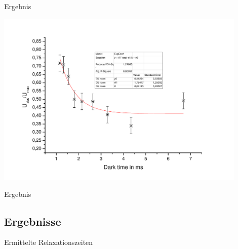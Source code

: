 \documentclass{beamer}
\begin{document}
\begin{frame}{Ergebnis}
\begin{center}
\centering \includegraphics[width=0.9\textwidth]{Bilder/Franzen.pdf}
\end{center}
\end{frame}

\begin{frame}{Ergebnis}
\end{frame}


\subsection{Ergebnisse}
\begin{frame}{Ermittelte Relaxationszeiten}
\end{frame}
\end{document}
